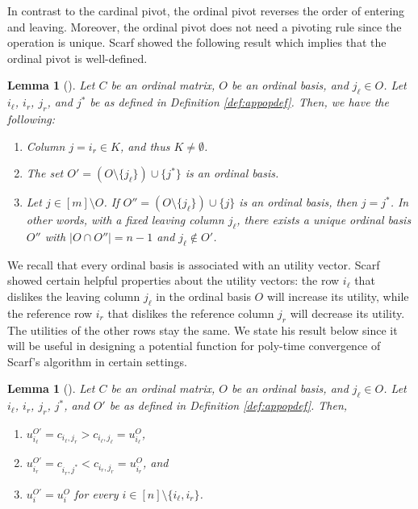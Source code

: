 \documentclass[11pt]{article}
\newtheorem{lemma}[theorem]{Lemma}
\begin{document}
In contrast to the cardinal pivot, the ordinal pivot reverses the order of entering and leaving. Moreover, the ordinal pivot does not need a pivoting rule since the operation is unique. Scarf showed the following result which implies that the ordinal pivot is well-defined. 
\begin{lemma}[\cite{scarf1967core}]\label{lem:op-def}
    Let $C$ be an ordinal matrix, $O$ be an ordinal basis, and $j_\ell\in O$. Let $i_{\ell}$, $i_r$, $j_r$, and $j^*$ be as defined in Definition \ref{def:appopdef}. Then, we have the following: 
\begin{enumerate}
    \item Column $j=i_r\in K$, and thus $K\neq\emptyset$.
    \item The set $O'=(O\setminus\{j_\ell\})\cup\{j^*\}$ is an ordinal basis.
    \item Let $j\in[m]\setminus O$. If $O''=(O\setminus\{j_\ell\})\cup\{j\}$ is an ordinal basis, then $j=j^*$. In other words, with a fixed leaving column $j_\ell$, there exists a unique ordinal basis $O''$ with $|O\cap O''|=n-1$ and $j_{\ell}\not\in O'$. \end{enumerate}
\end{lemma}

We recall that every ordinal basis is associated with an utility vector. Scarf showed certain helpful properties about the utility vectors: the row $i_\ell$ that dislikes the leaving column $j_\ell$ in the ordinal basis $O$ will increase its utility, while the reference row $i_r$ that dislikes the reference column $j_r$ will decrease its utility. The utilities of the other rows stay the same. We state his result below since it will be useful in designing a potential function for poly-time convergence of Scarf's algorithm in certain settings. 

\begin{lemma}[\cite{scarf1967core}]\label{lem:utility}
    Let $C$ be an ordinal matrix, $O$ be an ordinal basis, and $j_\ell\in O$. Let $i_{\ell}$, $i_r$, $j_r$, $j^*$, and $O'$ be as defined in Definition \ref{def:appopdef}. 
    Then, 
    \begin{enumerate}
    \item $u^{O'}_{i_\ell}=c_{i_\ell,j_r}>c_{i_\ell,j_\ell}=u^O_{i_\ell}$, 
    \item $u^{O'}_{i_r}=c_{i_r,j^*}<c_{i_r,j_r}=u^O_{i_r}$, and 
    \item $u^{O'}_{i}=u^O_{i}$ for every $i \in [n]\setminus\{i_{\ell}, i_r\}$. 
    \end{enumerate}
\end{lemma}
\end{document}
